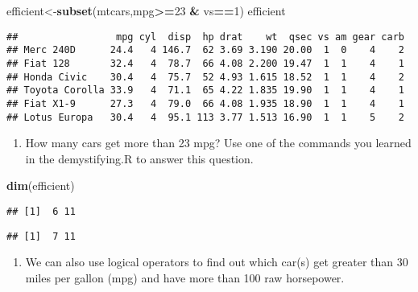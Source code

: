 \documentclass[]{article}
\newenvironment{Shaded}{\begin{snugshade}}{\end{snugshade}}
\newcommand{\KeywordTok}[1]{\textcolor[rgb]{0.13,0.29,0.53}{\textbf{#1}}}
\newcommand{\DecValTok}[1]{\textcolor[rgb]{0.00,0.00,0.81}{#1}}
\newcommand{\StringTok}[1]{\textcolor[rgb]{0.31,0.60,0.02}{#1}}
\newcommand{\OperatorTok}[1]{\textcolor[rgb]{0.81,0.36,0.00}{\textbf{#1}}}
\newcommand{\NormalTok}[1]{#1}
\providecommand{\tightlist}{%
  \setlength{\itemsep}{0pt}\setlength{\parskip}{0pt}}
\begin{document}
\begin{Shaded}
\begin{Highlighting}[]
\NormalTok{efficient<-}\KeywordTok{subset}\NormalTok{(mtcars,mpg}\OperatorTok{>=}\DecValTok{23} \OperatorTok{&}\StringTok{ }\NormalTok{vs}\OperatorTok{==}\DecValTok{1}\NormalTok{)}
\NormalTok{efficient}
\end{Highlighting}
\end{Shaded}

\begin{verbatim}
##                 mpg cyl  disp  hp drat    wt  qsec vs am gear carb
## Merc 240D      24.4   4 146.7  62 3.69 3.190 20.00  1  0    4    2
## Fiat 128       32.4   4  78.7  66 4.08 2.200 19.47  1  1    4    1
## Honda Civic    30.4   4  75.7  52 4.93 1.615 18.52  1  1    4    2
## Toyota Corolla 33.9   4  71.1  65 4.22 1.835 19.90  1  1    4    1
## Fiat X1-9      27.3   4  79.0  66 4.08 1.935 18.90  1  1    4    1
## Lotus Europa   30.4   4  95.1 113 3.77 1.513 16.90  1  1    5    2
\end{verbatim}

\begin{enumerate}
\def\labelenumi{\arabic{enumi}.}
\setcounter{enumi}{2}
\tightlist
\item
  How many cars get more than 23 mpg? Use one of the commands you
  learned in the demystifying.R to answer this question.
\end{enumerate}

\begin{Shaded}
\begin{Highlighting}[]
\KeywordTok{dim}\NormalTok{(efficient)}
\end{Highlighting}
\end{Shaded}

\begin{verbatim}
## [1]  6 11
\end{verbatim}

\begin{Shaded}
\end{Shaded}

\begin{verbatim}
## [1]  7 11
\end{verbatim}

\begin{enumerate}
\def\labelenumi{\arabic{enumi}.}
\setcounter{enumi}{3}
\tightlist
\item
  We can also use logical operators to find out which car(s) get greater
  than 30 miles per gallon (mpg) and have more than 100 raw horsepower.
\end{enumerate}
\end{document}
